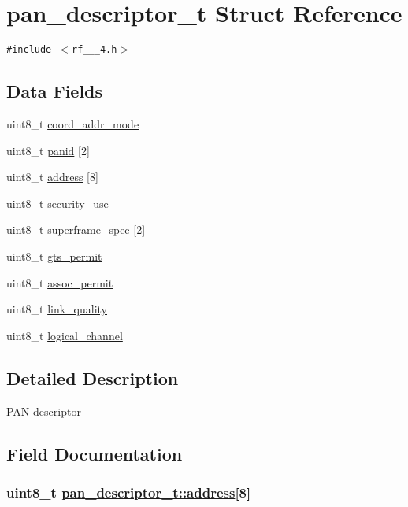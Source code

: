 \hypertarget{structpan__descriptor__t}{
\section{pan\_\-descriptor\_\-t Struct Reference}
\label{structpan__descriptor__t}
}
{\tt \#include $<$rf\_\_\_\-4.h$>$}

\subsection*{Data Fields}
\begin{CompactItemize}
\item 
uint8\_\-t \hyperlink{structpan__descriptor__t_1c8d355ca5d2215605090a65b15c4b76}{coord\_\-addr\_\-mode}
\item 
uint8\_\-t \hyperlink{structpan__descriptor__t_e94a30aedfc41b7ca0e551bd8928a3ab}{panid} \mbox{[}2\mbox{]}
\item 
uint8\_\-t \hyperlink{structpan__descriptor__t_06b11f6bb4786384c45457c81e9335e5}{address} \mbox{[}8\mbox{]}
\item 
uint8\_\-t \hyperlink{structpan__descriptor__t_d1f137dbd55028eaedf8ff0b444dfe25}{security\_\-use}
\item 
uint8\_\-t \hyperlink{structpan__descriptor__t_53f9ddb90f42af95b7a62d48c9a891a0}{superframe\_\-spec} \mbox{[}2\mbox{]}
\item 
uint8\_\-t \hyperlink{structpan__descriptor__t_0947e8dac75a8b36c19aa1c7d1af6e0f}{gts\_\-permit}
\item 
uint8\_\-t \hyperlink{structpan__descriptor__t_eaeabc250f8e65872e96b2b0d7b12061}{assoc\_\-permit}
\item 
uint8\_\-t \hyperlink{structpan__descriptor__t_07f083a4298ec06fd86e920ef3eb4a47}{link\_\-quality}
\item 
uint8\_\-t \hyperlink{structpan__descriptor__t_17a106035a332e15842bf81b5038a813}{logical\_\-channel}
\end{CompactItemize}


\subsection{Detailed Description}
PAN-descriptor 



\subsection{Field Documentation}
\hypertarget{structpan__descriptor__t_06b11f6bb4786384c45457c81e9335e5}{
\subsubsection[address]{\setlength{\rightskip}{0pt plus 5cm}uint8\_\-t \hyperlink{structpan__descriptor__t_06b11f6bb4786384c45457c81e9335e5}{pan\_\-descriptor\_\-t::address}\mbox{[}8\mbox{]}}}
\label{structpan__descriptor__t_06b11f6bb4786384c45457c81e9335e5}


